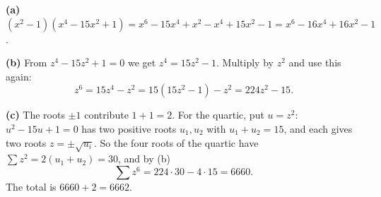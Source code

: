 \textbf{(a)} $\left(x^2-1\right)\left(x^4-15x^2+1\right)=x^6-15x^4+x^2-x^4+15x^2-1=x^6-16x^4+16x^2-1$.

\textbf{(b)} From $z^4-15z^2+1=0$ we get $z^4=15z^2-1$. Multiply by $z^2$ and use this again:
\[z^6=15z^4-z^2=15\left(15z^2-1\right)-z^2=224z^2-15.\]

\textbf{(c)} The roots $\pm1$ contribute $1+1=2$. For the quartic, put $u=z^2$: $u^2-15u+1=0$ has two positive roots $u_1,u_2$ with $u_1+u_2=15$, and each gives two roots $z=\pm\sqrt{u_i}$. So the four roots of the quartic have $\sum z^2=2(u_1+u_2)=30$, and by (b)
\[\sum z^6=224\cdot30-4\cdot15=6660.\]
The total is $6660+2=\boxed{6662}$.
